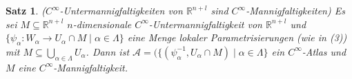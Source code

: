 \documentclass[a4paper,11pt,notitlepage]{report}
\newtheorem{theorem}{Satz}[chapter]
\newcommand{\R}{{\ensuremath{\mathbb{R}}}}
\begin{document}
\begin{theorem}{($C^\infty$-Untermannigfaltigkeiten von $\R^{n+l}$ sind $C^\infty$-Mannigfaltigkeiten)}
	Es sei $M \subseteq \R^{n+l}$ $n$-dimensionale $C^\infty$-Untermannigfaltigkeit von $\R^{n+l}$ und $\{\psi_\alpha \colon W_\alpha \rightarrow U_\alpha \cap M \mid \alpha \in \Lambda\}$ eine Menge lokaler Parametrisierungen (wie in (3)) mit $M \subseteq \bigcup\limits_{\alpha \in \Lambda}{U_\alpha}$.
	Dann ist $\mathcal{A} = (\{(\psi_\alpha^{-1}, U_\alpha \cap M) \mid \alpha \in \Lambda\}$ ein $C^\infty$-Atlas und $M$ eine $C^\infty$-Mannigfaltigkeit.
\end{theorem}
 
\end{document}
